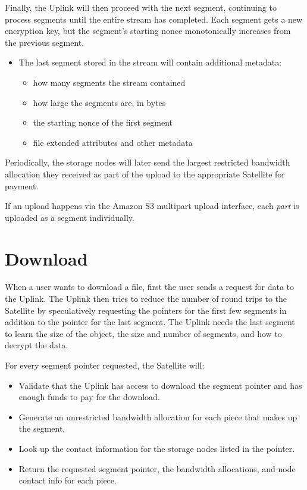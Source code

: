 \documentclass[8pt,fleqn,openany]{book}
\begin{document}
Finally, the Uplink will then proceed with the next segment, continuing to
process segments until the entire stream has completed. Each segment gets
a new encryption key, but the segment's starting nonce monotonically increases
from the previous segment.

\begin{itemize}
\item The last segment stored in the stream will contain additional metadata:
  \begin{itemize}
  \item how many segments the stream contained
  \item how large the segments are, in bytes
  \item the starting nonce of the first segment
  \item file extended attributes and other metadata
  \end{itemize}
\end{itemize}

Periodically, the storage nodes will later send the largest restricted
bandwidth allocation they received as part of the upload to the appropriate
Satellite for payment.

If an upload happens via the Amazon S3 multipart upload interface, each
{\em part} is uploaded as a segment individually.

\section{Download}

When a user wants to download a file, first the user sends a request for
data to the Uplink.
  The Uplink then tries to reduce the number of round trips to the Satellite
  by speculatively requesting the pointers for the first few segments in
  addition to the pointer for the last segment. The Uplink needs the last
  segment to learn the size of the object, the size and number of segments,
  and how to decrypt the data.

For every segment pointer requested, the Satellite will:
  \begin{itemize}
  \item Validate that the Uplink has access to download the segment pointer
    and has enough funds to pay for the download.
  \item Generate an unrestricted bandwidth allocation for each piece that
    makes up the segment.
  \item Look up the contact information for the storage nodes listed in the
  pointer.
  \item Return the requested segment pointer, the bandwidth allocations, and
    node contact info for each piece.
  \end{itemize}
\end{document}
